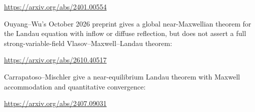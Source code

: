 \url{https://arxiv.org/abs/2401.00554}

Ouyang--Wu's October 2026 preprint gives a global near-Maxwellian
theorem for the Landau equation with inflow or diffuse reflection, but
does not assert a full strong-variable-field Vlasov--Maxwell--Landau
theorem:

\url{https://arxiv.org/abs/2610.40517}

Carrapatoso--Mischler give a near-equilibrium Landau theorem with
Maxwell accommodation and quantitative convergence:

\url{https://arxiv.org/abs/2407.09031}
